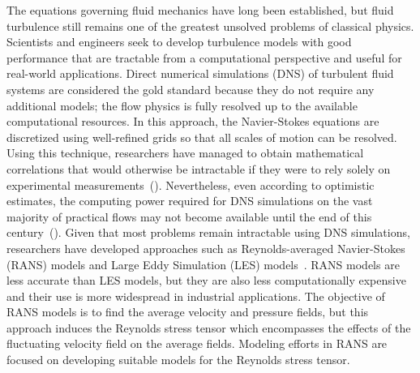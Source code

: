 \documentclass[11pt]{article}
\numberwithin{equation}{section}
\theoremstyle{plain}
\theoremstyle{definition}
\begin{document}
The equations governing fluid mechanics have long been established, but fluid turbulence still remains one of the greatest unsolved problems of classical physics. Scientists and engineers seek to develop turbulence models with good performance that are tractable from a computational perspective and useful for real-world applications. Direct numerical simulations (DNS) of turbulent fluid systems are considered the gold standard because they do not require any additional models; the flow physics is fully resolved up to the available computational resources. In this approach, the Navier-Stokes equations are discretized using well-refined grids so that all scales of motion can be resolved. Using this technique, researchers have managed to obtain mathematical correlations that would otherwise be intractable if they were to rely solely on experimental measurements~(\cite{dns_review}). Nevertheless, even according to optimistic estimates, the computing power required for DNS simulations on the vast majority of practical flows may not become available until the end of this century~(\cite{dns_couette}). Given that most problems remain intractable using DNS simulations, researchers have developed approaches such as Reynolds-averaged Navier-Stokes (RANS) models and Large Eddy Simulation (LES) models~\cite{alma993553114401591}. RANS models are less accurate than LES models, but they are also less computationally expensive and their use is more widespread in industrial applications. The objective of RANS models is to find the average velocity and pressure fields, but this approach induces the Reynolds stress tensor which encompasses the effects of the fluctuating velocity field on the average fields. Modeling efforts in RANS are focused on developing suitable models for the Reynolds stress tensor.
\end{document}
